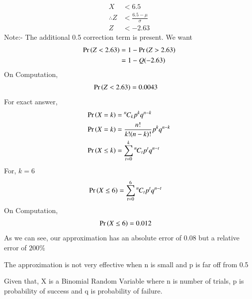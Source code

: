 \documentclass[journal,12pt,twocolumn]{IEEEtran}
\newcommand{\permcomb}[4][0mu]{{{}^{#3}\mkern#1#2_{#4}}}
\newcommand{\comb}[1][-1mu]{\permcomb[#1]{C}}
\begin{document}
\begin{align}
    X &< 6.5\\
    \therefore Z &< \frac{6.5-\mu}{\sigma}\\
    Z&<-2.63
\end{align}
Note:- The additional 0.5 correction term is present.
We want
\begin{align}
\Pr\left(Z<2.63\right) &= 1-\Pr\left(Z>2.63\right)\\
    &= 1- Q(-2.63)
\end{align}
On Computation,
\begin{align}
\Pr\left(Z<2.63\right) &= 0.0043
\end{align}
For exact answer,
\begin{align}
    \pr{X=k} &= \comb{n}{k}p^k q^{n-k}\\
    \pr{X = k} &= \frac{n!}{k!(n-k)!}p^kq^{n-k}\\
    \pr{X \le k} &= \sum_{t=0}^{k} \comb{n}{t}p^t q^{n-t}
\end{align}
For, $k=6$
\begin{align}
    \pr{X \le 6} &= \sum_{t=0}^{6} \comb{n}{t}p^t q^{n-t}
\end{align}
On Computation,
\begin{align}
    \Pr\left(X\le 6\right) &= 0.012
\end{align}
As we can see, our approximation has an absolute error of $0.08$ but a relative error of $200\%$

The approximation is not very effective when n is small and p is far off from 0.5



\newpage
Given that, X is a Binomial Random Variable where n is number of trials, p is probability of success and q is probability of failure.
\end{document}

